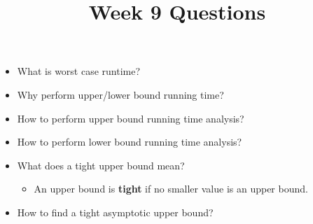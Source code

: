 \documentclass[12pt]{article}
\begin{document}
\title{Week 9 Questions}
\maketitle

\begin{itemize}
    \item
    What is worst case runtime?

    \item
    Why perform upper/lower bound running time?

    \item
    How to perform upper bound running time analysis?

    \item
    How to perform lower bound running time analysis?

    \item

    What does a tight upper bound mean?

    \begin{itemize}
        \item An upper bound is \textbf{tight} if no smaller value is an upper bound.
    \end{itemize}

    \item

    How to find a tight asymptotic upper bound?

\end{itemize}
\end{document}
